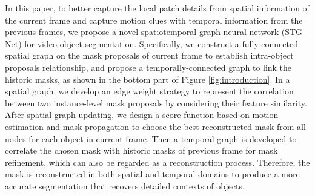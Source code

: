 \documentclass[letterpaper]{article} %
\begin{document}
In this paper, to better capture the local patch details from spatial information of the current frame and capture motion clues with temporal information from the previous frames, we propose a novel spatiotemporal graph neural network (STG-Net) for video object segmentation. Specifically, we construct a fully-connected spatial graph on the mask proposals of current frame to establish intra-object proposals relationship, and propose a temporally-connected graph to link the historic masks, as shown in the bottom part of Figure \ref{fig:introduction}. In a spatial graph, we develop an edge weight strategy to represent the correlation between two instance-level mask proposals by considering their feature similarity. After spatial graph updating, we design a score function based on motion estimation and mask propagation to choose the best reconstructed mask from all nodes for each object in current frame. Then a temporal graph is developed to correlate the chosen mask with historic masks of previous frame for mask refinement, which can also be regarded as a reconstruction process. Therefore, the mask is reconstructed in both spatial and temporal domains to produce a more accurate segmentation that recovers detailed contexts of objects.
\end{document}
